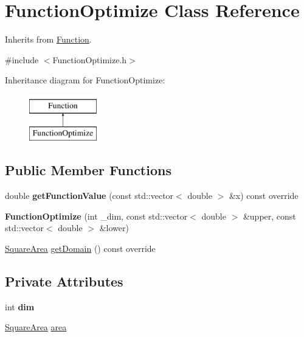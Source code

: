 \hypertarget{class_function_optimize}{}\section{Function\+Optimize Class Reference}
\label{class_function_optimize}


Inherits from \hyperlink{class_function}{Function}.  




{\ttfamily \#include $<$Function\+Optimize.\+h$>$}

Inheritance diagram for Function\+Optimize\+:\begin{figure}[H]
\begin{center}
\leavevmode
\includegraphics[height=2.000000cm]{class_function_optimize}
\end{center}
\end{figure}
\subsection*{Public Member Functions}
\begin{DoxyCompactItemize}
\item 
\mbox{\label{class_function_optimize_a86b7d0ad4ff9ca2706cb38f7b885771b}} 
double {\bfseries get\+Function\+Value} (const std\+::vector$<$ double $>$ \&x) const override
\item 
\mbox{\label{class_function_optimize_a2b3d0e6b150a4418ad94bdc31b05a169}} 
{\bfseries Function\+Optimize} (int \+\_\+dim, const std\+::vector$<$ double $>$ \&upper, const std\+::vector$<$ double $>$ \&lower)
\item 
\hyperlink{class_square_area}{Square\+Area} \hyperlink{class_function_optimize_a5b2a52f2851494a02fbd52b1862a98ae}{get\+Domain} () const override
\end{DoxyCompactItemize}
\subsection*{Private Attributes}
\begin{DoxyCompactItemize}
\item 
\mbox{\label{class_function_optimize_afb9111deb3d272e4648795e23e5271ca}} 
int {\bfseries dim}
\item 
\hyperlink{class_square_area}{Square\+Area} \hyperlink{class_function_optimize_ab3593f5f260c05abe0c7704b2356890c}{area}
\end{DoxyCompactItemize}



